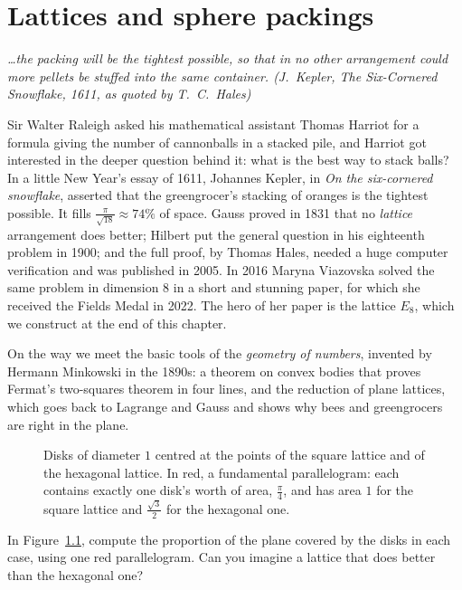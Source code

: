 \chapter{Lattices and sphere packings}\label{geometry:ch:lattices}

\begin{center}\itshape
\dots the packing will be the tightest possible, so that in no other arrangement could more pellets be stuffed into the same container.
\upshape(J.~Kepler, \emph{The Six-Cornered Snowflake}, 1611, as quoted by T.~C.~Hales)
\end{center}

Sir Walter Raleigh asked his mathematical assistant Thomas Harriot for a formula giving the number of cannonballs in a stacked pile, and
Harriot got interested in the deeper question behind it: what is the best way to stack balls? In a little New Year's essay of 1611, Johannes Kepler, in \emph{On the six-cornered snowflake}, asserted that the greengrocer's stacking of oranges is the tightest possible.
It fills $\frac\pi{\sqrt{18}}\approx74\%$ of space. Gauss proved in 1831 that no \emph{lattice} arrangement does better; Hilbert put the general question
in his eighteenth problem in 1900; and the full proof, by Thomas Hales, needed a huge computer verification and was published in 2005. In 2016 Maryna
Viazovska solved the same problem in dimension $8$ in a short and stunning paper, for which she received the Fields Medal in 2022. The hero of her paper
is the lattice $E_8$, which we construct at the end of this chapter.

On the way we meet the basic tools of the \emph{geometry of numbers}, invented by Hermann Minkowski in the 1890s: a theorem on convex bodies that proves
Fermat's two-squares theorem in four lines, and the reduction of plane lattices, which goes back to Lagrange and Gauss and shows why bees and
greengrocers are right in the plane.

\begin{figure}[ht]
\centering
{}
\caption{Disks of diameter $1$ centred at the points of the square lattice and of the hexagonal lattice. In red, a fundamental parallelogram: each
contains exactly one disk's worth of area, $\frac\pi4$, and has area $1$ for the square lattice and $\frac{\sqrt3}2$ for the hexagonal one.}
\label{geometry:fig:packings}
\end{figure}

\begin{think}
In Figure~\ref{geometry:fig:packings}, compute the proportion of the plane covered by the disks in each case, using one red parallelogram. Can you imagine a lattice
that does better than the hexagonal one?
\end{think}

